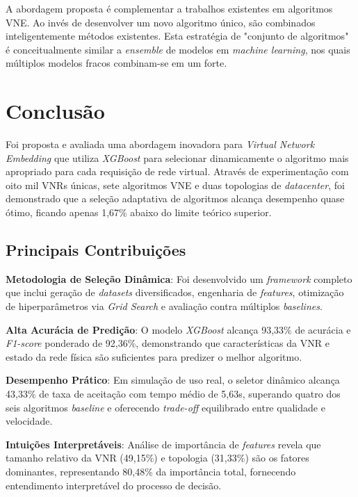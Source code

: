 \documentclass[conference]{IEEEtran}
\begin{document}
A abordagem proposta é complementar a trabalhos existentes em algoritmos VNE. Ao invés de desenvolver um novo algoritmo único, são combinados inteligentemente métodos existentes. Esta estratégia de "conjunto de algoritmos" é conceitualmente similar a \textit{ensemble} de modelos em \textit{machine learning}, nos quais múltiplos modelos fracos combinam-se em um forte.

\section{Conclusão}
\label{sec:Conclusion}

Foi proposta e avaliada uma abordagem inovadora para \textit{Virtual Network Embedding} que utiliza \textit{XGBoost} para selecionar dinamicamente o algoritmo mais apropriado para cada requisição de rede virtual. Através de experimentação com oito mil VNRs únicas, sete algoritmos VNE e duas topologias de \textit{datacenter}, foi demonstrado que a seleção adaptativa de algoritmos alcança desempenho quase ótimo, ficando apenas 1,67\% abaixo do limite teórico superior.

\subsection{Principais Contribuições}

\textbf{Metodologia de Seleção Dinâmica}: Foi desenvolvido um \textit{framework} completo que inclui geração de \textit{datasets} diversificados, engenharia de \textit{features}, otimização de hiperparâmetros via \textit{Grid Search} e avaliação contra múltiplos \textit{baselines}.

\textbf{Alta Acurácia de Predição}: O modelo \textit{XGBoost} alcança 93,33\% de acurácia e \textit{F1-score} ponderado de 92,36\%, demonstrando que características da VNR e estado da rede física são suficientes para predizer o melhor algoritmo.

\textbf{Desempenho Prático}: Em simulação de uso real, o seletor dinâmico alcança 43,33\% de taxa de aceitação com tempo médio de 5,63s, superando quatro dos seis algoritmos \textit{baseline} e oferecendo \textit{trade-off} equilibrado entre qualidade e velocidade.

\textbf{Intuições Interpretáveis}: Análise de importância de \textit{features} revela que tamanho relativo da VNR (49,15\%) e topologia (31,33\%) são os fatores dominantes, representando 80,48\% da importância total, fornecendo entendimento interpretável do processo de decisão.
\end{document}

